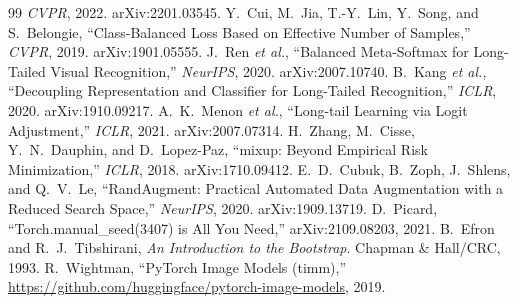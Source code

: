 \documentclass[11pt,a4paper]{article}
\begin{document}
\begin{thebibliography}{99}
\emph{CVPR}, 2022. arXiv:2201.03545.
 Y.~Cui, M.~Jia, T.-Y.~Lin, Y.~Song, and S.~Belongie,
``Class-Balanced Loss Based on Effective Number of Samples,'' \emph{CVPR}, 2019.
arXiv:1901.05555.
 J.~Ren \emph{et al.}, ``Balanced Meta-Softmax for Long-Tailed
Visual Recognition,'' \emph{NeurIPS}, 2020. arXiv:2007.10740.
 B.~Kang \emph{et al.}, ``Decoupling Representation and
Classifier for Long-Tailed Recognition,'' \emph{ICLR}, 2020. arXiv:1910.09217.
 A.~K.~Menon \emph{et al.}, ``Long-tail Learning via Logit
Adjustment,'' \emph{ICLR}, 2021. arXiv:2007.07314.
 H.~Zhang, M.~Cisse, Y.~N.~Dauphin, and D.~Lopez-Paz, ``mixup:
Beyond Empirical Risk Minimization,'' \emph{ICLR}, 2018. arXiv:1710.09412.
 E.~D.~Cubuk, B.~Zoph, J.~Shlens, and Q.~V.~Le,
``RandAugment: Practical Automated Data Augmentation with a Reduced Search
Space,'' \emph{NeurIPS}, 2020. arXiv:1909.13719.
 D.~Picard, ``Torch.manual\_seed(3407) is All You Need,''
arXiv:2109.08203, 2021.
 B.~Efron and R.~J.~Tibshirani, \emph{An Introduction to the
Bootstrap}. Chapman \& Hall/CRC, 1993.
 R.~Wightman, ``PyTorch Image Models (timm),''
\url{https://github.com/huggingface/pytorch-image-models}, 2019.
\end{thebibliography}
\end{document}
